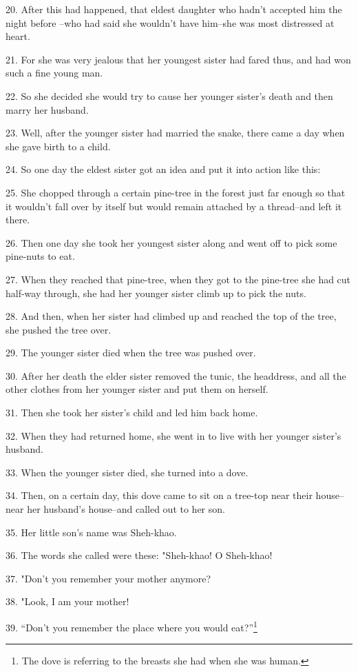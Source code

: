 20. After this had happened, that eldest daughter who hadn't accepted him the night
before --who had said she wouldn't have him--she was most distressed at heart.

21. For she was very jealous that her youngest sister had fared thus, and had won
such a fine young man.

22. So she decided she would try to cause her younger sister's death and then marry
her husband.

23. Well, after the younger sister had married the snake, there came a day when
she gave birth to a child.

24. So one day the eldest sister got an idea and put it into action like this:

25. She chopped through a certain pine-tree in the forest just far enough so that
it wouldn't fall over by itself but would remain attached by a thread--and left
it there.

26. Then one day she took her youngest sister along and went off to pick some pine-nuts
to eat.

27. When they reached that pine-tree, when they got to the pine-tree she had cut
half-way through, she had her younger sister climb up to pick the nuts.

28. And then, when her sister had climbed up and reached the top of the tree, she
pushed the tree over.

29. The younger sister died when the tree was pushed over.

30. After her death the elder sister removed the tunic, the headdress, and all
the other clothes from her younger sister and put them on herself.

31. Then she took her sister's child and led him back home.

32. When they had returned home, she went in to live with her younger sister's
husband.

33. When the younger sister died, she turned into a dove.

34. Then, on a certain day, this dove came to sit on a tree-top near their house--near
her husband's house--and called out to her son.

35. Her little son's name was Sheh-khao.

36. The words she called were these: "Sheh-khao! O Sheh-khao!

37. "Don't you remember your mother anymore?

38. "Look, I am your mother!

39. ``Don't you remember the place where you would eat?''\footnote{The dove is referring to the breasts she had when she was human.}

